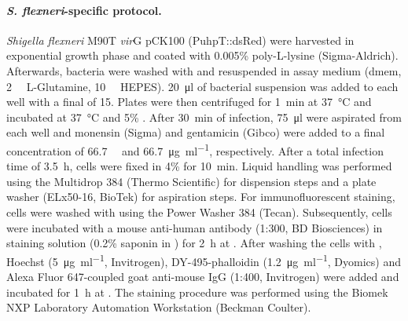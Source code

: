 \paragraph{\textit{S. flexneri}-specific protocol.}
\textit{Shigella flexneri} M90T \textDelta\textit{vir}G pCK100 (PuhpT::ds\-Red) were harvested in exponential growth phase and coated with 0.005\% poly-L-lysine (Sigma-Aldrich). Afterwards, bacteria were washed with  and resuspended in assay medium (\acrshort{dmem}, \SI{2}{\milli\Molar} L-Glutamine, \SI{10}{\milli\Molar} HEPES). \SI{20}{\micro\litre} of bacterial suspension was added to each well with a final  of 15. Plates were then centrifuged for \SI{1}{\minute} at \SI{37}{\celsius} and incubated at \SI{37}{\celsius} and 5\% . After \SI{30}{\minute} of infection, \SI{75}{\micro\litre} were aspirated from each well and monensin (Sigma) and gentamicin (Gibco) were added to a final concentration of \SI{66.7}{\micro\Molar} and \SI{66.7}{\micro\gram\per\milli\litre}, respectively. After a total infection time of \SI{3.5}{\hour}, cells were fixed in 4\%  for \SI{10}{\minute}. Liquid handling was performed using the Multidrop 384 (Thermo Scientific) for dispension steps and a plate washer (ELx50-16, BioTek) for aspiration steps. For immunofluorescent staining, cells were washed with  using the Power Washer 384 (Tecan). Subsequently, cells were incubated with a mouse anti-human  antibody (1:300, BD Biosciences) in staining solution (0.2\% saponin in ) for \SI{2}{\hour} at . After washing the cells with , Hoechst (\SI{5}{\micro\gram\per\milli\litre}, Invitrogen), DY-495-phalloidin (\SI{1.2}{\micro\gram\per\milli\litre}, Dyomics) and Alexa Fluor 647-coupled goat anti-mouse IgG (1:400, Invitrogen) were added and incubated for \SI{1}{\hour} at . The staining procedure was performed using the Biomek NXP Laboratory Automation Workstation (Beckman Coulter).

